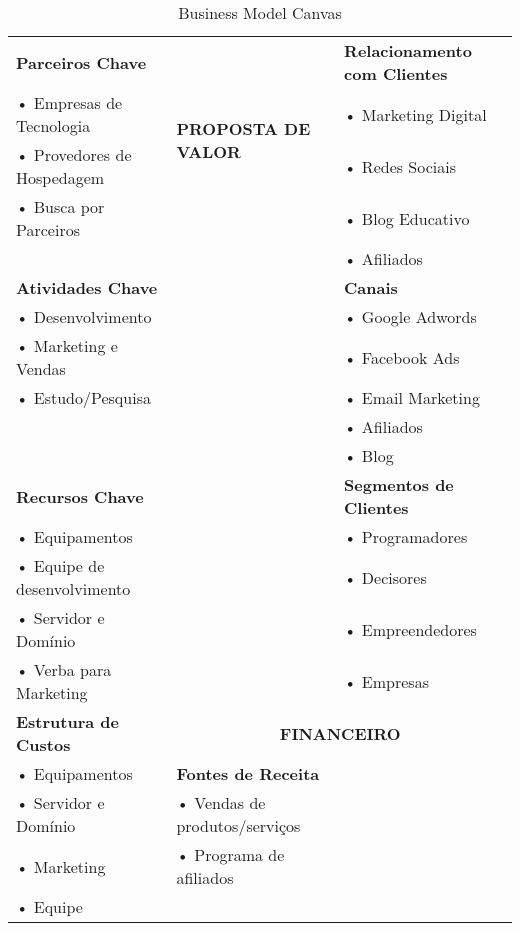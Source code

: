 \documentclass{article}
\begin{document}
\begin{table}
\centering
\renewcommand{\arraystretch}{1.8}
\begin{tabular}{|p{5cm}|p{5cm}|p{5cm}|}
\hline
\rowcolor{lightgray}
\textbf{Parceiros Chave} & 
\multirow{4}{*}{\centering\textbf{\LARGE PROPOSTA DE VALOR}} & 
\textbf{Relacionamento com Clientes} \\
\cline{1-1}\cline{3-3}
• Empresas de Tecnologia & & • Marketing Digital \\
• Provedores de Hospedagem & & • Redes Sociais \\
• Busca por Parceiros & & • Blog Educativo \\
& & • Afiliados \\
\hline
\rowcolor{lightgray}
\textbf{Atividades Chave} & & \textbf{Canais} \\
\cline{1-1}\cline{3-3}
• Desenvolvimento & & • Google Adwords \\
• Marketing e Vendas & & • Facebook Ads \\
• Estudo/Pesquisa & & • Email Marketing \\
& & • Afiliados \\
& & • Blog \\
\hline
\rowcolor{lightgray}
\textbf{Recursos Chave} & & \textbf{Segmentos de Clientes} \\
\cline{1-1}\cline{3-3}
• Equipamentos & & • Programadores \\
• Equipe de desenvolvimento & & • Decisores \\
• Servidor e Domínio & & • Empreendedores \\
• Verba para Marketing & & • Empresas \\
\hline
\rowcolor{lightgray}
\textbf{Estrutura de Custos} & \multicolumn{2}{c|}{\textbf{FINANCEIRO}} \\
\cline{1-3}
• Equipamentos & \rowcolor{lightgray}\textbf{Fontes de Receita} & \\
• Servidor e Domínio & • Vendas de produtos/serviços & \\
• Marketing & • Programa de afiliados & \\
• Equipe & & \\
\hline
\end{tabular}
\caption{Business Model Canvas}
\end{table}
\end{document}
